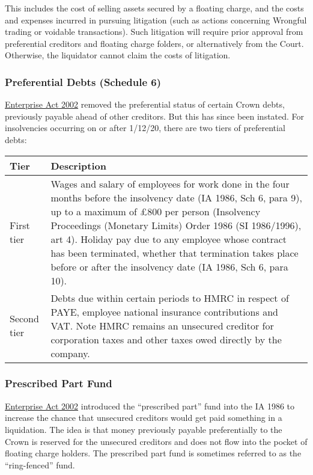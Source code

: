 \documentclass[
]{article}
\begin{document}
This includes the cost of selling assets secured by a floating charge,
and the costs and expenses incurred in pursuing litigation (such as
actions concerning Wrongful trading or voidable transactions). Such
litigation will require prior approval from preferential creditors and
floating charge folders, or alternatively from the Court. Otherwise, the
liquidator cannot claim the costs of litigation.

\hypertarget{preferential-debts-schedule-6}{%
\subsubsection{Preferential Debts (Schedule
6)}\label{preferential-debts-schedule-6}}

\href{https://www.legislation.gov.uk/ukpga/2002/40/contents}{Enterprise
Act 2002} removed the preferential status of certain Crown debts,
previously payable ahead of other creditors. But this has since been
instated. For insolvencies occurring on or after 1/12/20, there are two
tiers of preferential debts:

\begin{longtable}[]{@{}ll@{}}
\toprule()
Tier & Description \\
\midrule()
\endhead
First tier & Wages and salary of employees for work done in the four
months before the insolvency date (IA 1986, Sch 6, para 9), up to a
maximum of £800 per person (Insolvency Proceedings (Monetary Limits)
Order 1986 (SI 1986/1996), art 4). Holiday pay due to any employee whose
contract has been terminated, whether that termination takes place
before or after the insolvency date (IA 1986, Sch 6, para 10). \\
Second tier & Debts due within certain periods to HMRC in respect of
PAYE, employee national insurance contributions and VAT. Note HMRC
remains an unsecured creditor for corporation taxes and other taxes owed
directly by the company. \\
\bottomrule()
\end{longtable}

\hypertarget{prescribed-part-fund}{%
\subsubsection{Prescribed Part Fund}\label{prescribed-part-fund}}

\href{https://www.legislation.gov.uk/ukpga/2002/40/contents}{Enterprise
Act 2002} introduced the ``prescribed part'' fund into the IA 1986 to
increase the chance that unsecured creditors would get paid something in
a liquidation. The idea is that money previously payable preferentially
to the Crown is reserved for the unsecured creditors and does not flow
into the pocket of floating charge holders. The prescribed part fund is
sometimes referred to as the ``ring-fenced'' fund.
\end{document}
